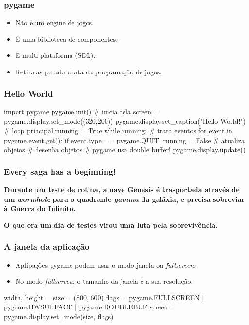 \begin{frame}
    \frametitle{pygame}

    \begin{itemize}
        \item Não é um engine de jogos.
        \item É uma biblioteca de componentes.
        \item É multi-plataforma (SDL).
        \item Retira as parada chata da programação de jogos.
    \end{itemize}
\end{frame}

\begin{frame}[fragile]
    \frametitle{Hello World}

    \begin{python}
        import pygame
        pygame.init()
        # inicia tela
        screen = pygame.display.set_mode((320,200))
        pygame.display.set_caption("Hello World!")
        # loop principal
        running = True
        while running:
            # trata eventos
            for event in pygame.event.get():
                if event.type == pygame.QUIT:
                    running = False
            # atualiza objetos
            # desenha objetos
            # pygame usa double buffer!
            pygame.display.update()
    \end{python}
\end{frame}


\begin{frame}
    \frametitle{Every saga has a beginning!}
    \hfill
    \begin{center}
    \large \textbf{Durante um teste de rotina, a nave Genesis é trasportada
    através de um \textit{wormhole} para o quadrante \textit{gamma} da galáxia,
    e precisa sobreviar à Guerra do Infinito.}

    \hfill
    \large\textbf{O que era um dia de testes virou uma luta pela sobrevivência.}
    \end{center}
    \hfill
\end{frame}

\begin{frame}[fragile]
    \frametitle{A janela da aplicação}

    \begin{itemize}
        \item Aplipações pygame podem usar o modo janela ou \textit{fullscreen}.
        \item No modo \textit{fullscreen}, o tamanho da janela é a sua resolução.
    \end{itemize}
    \begin{python}
    width, height = size = (800, 600)
    flags = pygame.FULLSCREEN | pygame.HWSURFACE | pygame.DOUBLEBUF
    screen = pygame.display.set_mode(size, flags)
    \end{python}
\end{frame}

